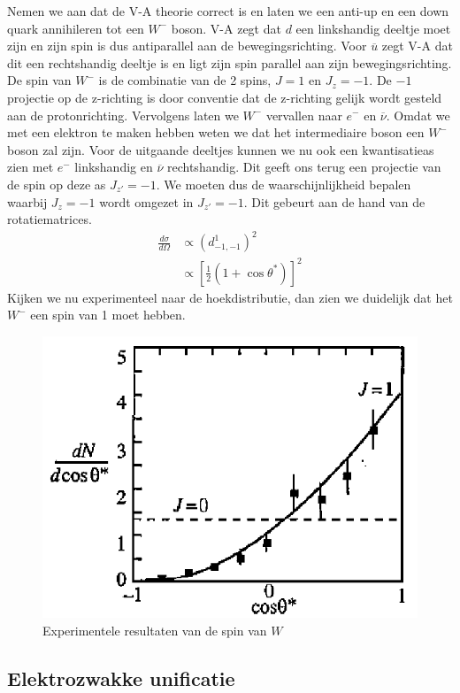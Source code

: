 \documentclass[../main.tex]{subfiles}
\begin{document}
Nemen we aan dat de V-A theorie correct is en laten we een anti-up en een down quark annihileren tot een $W^-$ boson. V-A zegt dat $d$ een linkshandig deeltje moet zijn en zijn spin is dus antiparallel aan de bewegingsrichting. Voor $\overline u$ zegt V-A dat dit een rechtshandig deeltje is en ligt zijn spin parallel aan zijn bewegingsrichting. De spin van $W^-$ is de combinatie van de 2 spins, $J=1$ en $J_z=-1$. De $-1$ projectie op de z-richting is door conventie dat de z-richting gelijk wordt gesteld aan de protonrichting. Vervolgens laten we $W^-$ vervallen naar $e^-$ en $\overline \nu$. Omdat we met een elektron te maken hebben weten we dat het intermediaire boson een $W^-$ boson zal zijn. Voor de uitgaande deeltjes kunnen we nu ook een kwantisatieas zien met $e^-$ linkshandig en $\overline \nu$ rechtshandig. Dit geeft ons terug een projectie van de spin op deze as $J_{z'}=-1$. We moeten dus de waarschijnlijkheid bepalen waarbij $J_z=-1$ wordt omgezet in $J_{z'}=-1$. Dit gebeurt aan de hand van de rotatiematrices.
\begin{equation}
    \begin{aligned}
        \label{eq:kans_proj_omz}
        \frac{d\sigma}{d\Omega} &\propto (d_{-1,-1}^1)^2\\
                                &\propto \left[ \frac{1}{2} (1+\cos\theta^*)\right]^2
    \end{aligned}
\end{equation}
Kijken we nu experimenteel naar de hoekdistributie, dan zien we duidelijk dat het $W^-$ een spin van 1 moet hebben.

\begin{figure}[h]
    \centering
    \includegraphics[width=0.4\linewidth]{elektroweak_precision_tests/spin_van_w_resultaten.png}
    \caption{Experimentele resultaten van de spin van $W$}%
    \label{fig:elektroweak_precision_tests/spin_van_w_resultaten}
\end{figure}

\subsection{Elektrozwakke unificatie}%
\label{sub:elektrozwakke_unificatie}
\end{document}

